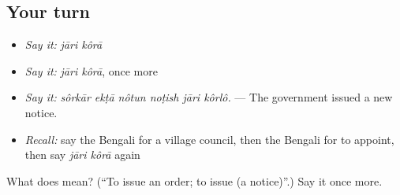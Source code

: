 \subsection*{Your turn}
\begin{itemize}
\raggedright
  \item \emph{Say it:} \emph{jāri kôrā}
  \item \emph{Say it:} \emph{jāri kôrā}, once more
  \item \emph{Say it:} \emph{sôrkār ekṭā nôtun noṭish jāri kôrlô.} — The government issued a new notice.
  \item \emph{Recall:} say the Bengali for a village council, then the Bengali for to appoint, then say \emph{jāri kôrā} again
\end{itemize}

\begin{tcolorbox}[breakable,colback=teal!4,colframe=teal!35!black,title={Before you move on}]
What does   mean? (\textquotedblleft{}To issue an order; to issue (a notice)\textquotedblright{}.) Say it once more.
\end{tcolorbox}

